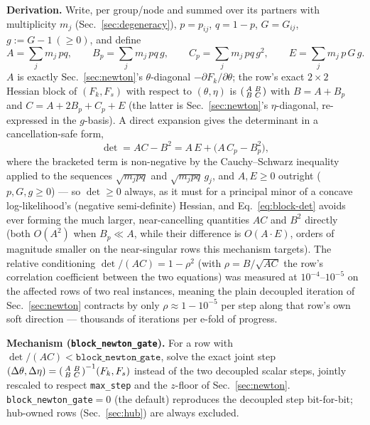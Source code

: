 \documentclass[10pt]{article}
\begin{document}
\textbf{Derivation.} Write, per group/node and summed over its partners
with multiplicity $m_j$ (Sec.~\ref{sec:degeneracy}), $p=p_{ij}$,
$q=1-p$, $G=G_{ij}$, $g:=G-1\ (\ge0)$, and define
\begin{equation}
A = \textstyle\sum_j m_j\,p q, \qquad
B_p = \textstyle\sum_j m_j\,p q\,g, \qquad
C_p = \textstyle\sum_j m_j\,p q\,g^2, \qquad
E = \textstyle\sum_j m_j\,p\,G\,g.
\end{equation}
$A$ is exactly Sec.~\ref{sec:newton}'s $\theta$-diagonal
$-\partial F_k/\partial\theta$; the row's exact $2\times2$ Hessian block
of $(F_k,F_s)$ with respect to $(\theta,\eta)$ is
$\begin{psmallmatrix}A & B\\ B & C\end{psmallmatrix}$ with $B=A+B_p$
and $C=A+2B_p+C_p+E$ (the latter is Sec.~\ref{sec:newton}'s $\eta$-diagonal,
re-expressed in the $g$-basis). A direct expansion gives the determinant in
a cancellation-safe form,
\begin{equation}
\label{eq:block-det}
\det = AC-B^2 = A\,E + \big(A\,C_p - B_p^2\big),
\end{equation}
where the bracketed term is non-negative by the Cauchy--Schwarz inequality
applied to the sequences $\sqrt{m_jpq}$ and $\sqrt{m_jpq}\,g_j$, and $A,E\ge0$
outright ($p,G,g\ge0$) --- so $\det\ge0$ always, as it must for a
principal minor of a concave log-likelihood's (negative semi-definite)
Hessian, and Eq.~\ref{eq:block-det} avoids ever forming the much larger,
near-cancelling quantities $AC$ and $B^2$ directly (both $O(A^2)$ when
$B_p\ll A$, while their difference is $O(A\cdot E)$, orders of magnitude
smaller on the near-singular rows this mechanism targets). The relative
conditioning $\det/(AC)=1-\rho^2$ (with $\rho=B/\sqrt{AC}$ the row's
correlation coefficient between the two equations) was measured at
$10^{-4}$--$10^{-5}$ on the affected rows of two real instances, meaning
the plain decoupled iteration of Sec.~\ref{sec:newton} contracts by only
$\rho\approx1-10^{-5}$ per step along that row's own soft direction ---
thousands of iterations per e-fold of progress.

\textbf{Mechanism (\texttt{block\_newton\_gate}).} For a row with
$\det/(AC) < \texttt{block\_newton\_gate}$, solve the exact joint step
$(\Delta\theta,\Delta\eta) = \begin{psmallmatrix}A&B\\B&C\end{psmallmatrix}^{-1}(F_k,F_s)$
instead of the two decoupled scalar steps, jointly rescaled to respect
\texttt{max\_step} and the $z$-floor of Sec.~\ref{sec:newton}.
\texttt{block\_newton\_gate}$=0$ (the default) reproduces the decoupled
step bit-for-bit; hub-owned rows (Sec.~\ref{sec:hub}) are always excluded.
\end{document}
